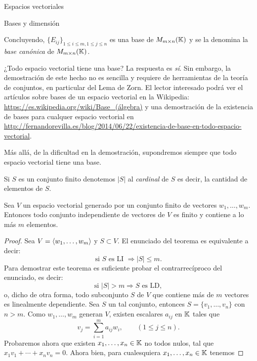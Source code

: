 \begin{chapter}{Espacios vectoriales}
\begin{section}{Bases y dimensi\'on}
\begin{ejemplo*}
    Concluyendo,  $\{E_{ij} \}_{1 \le i \le m, 1\le j \le n}$ es una base de  $M_{m \times n}(\mathbb K)$ y se la denomina la \textit{base canónica} de  $M_{m \times n}(\mathbb K)$.
\end{ejemplo*}

\begin{observacion*}
    ¿Todo espacio vectorial tiene una base? La respuesta es \textit{sí}. Sin embargo, la demostración de este hecho no es sencilla y requiere de herramientas de la teoría de conjuntos,  en particular del Lema de Zorn. El lector interesado podrá ver el artículos sobre bases de un espacio vectorial en la Wikipedia:  
    \href{https://es.wikipedia.org/wiki/Base\_(álgebra)}{https://es.wikipedia.org/wiki/Base\_(álgebra)} y una demostración de la existencia de bases para cualquer espacio vectorial en  
    \href{http://fernandorevilla.es/blog/2014/06/22/existencia-de-base-en-todo-espacio-vectorial/}{http://fernandorevilla.es/blog/2014/06/22/existencia-de-base-en-todo-espacio-vectorial}.

    Más allá, de la dificultad en la demostración, supondremos siempre que todo espacio vectorial tiene una base. 
\end{observacion*}

Si $S$ es un conjunto finito denotemos $|S|$  al \textit{cardinal} de  $S$ es decir, la cantidad de elementos de $S$. 

\begin{teorema}\label{indep-menorigual-gen}
    Sea $V$ un espacio vectorial generado por un conjunto finito de vectores $w_1,\ldots,w_m$. Entonces todo conjunto independiente de vectores de $V$ es finito y  contiene a lo más $m$ elementos. 
\end{teorema}
\begin{proof} Sea $V = \langle w_1,\ldots,w_m\rangle$ y  $S \subset V$.   El  enunciado del teorema es equivalente a decir:
    $$
    \text{si }S \text{ es LI } \Rightarrow |S| \le m.
    $$
    Para demostrar este teorema es suficiente probar el contrarrecíproco del enunciado, es decir:
    $$
    \text{si }|S| > m \Rightarrow S \text{ es LD},
    $$
    o, dicho  de otra forma, todo subconjunto $S$ de $V$ que contiene más de $m$ vectores es linealmente dependiente. Sea $S$ un tal conjunto,  entonces $S = \{v_1,\ldots,v_n\}$ con $n >m$.  Como  $w_1,\ldots,w_m$ generan $V$, existen escalares $a_{ij}$ en $\mathbb K$ tales que
    \begin{equation*}
        v_j = \sum_{i=1}^{m}a_{ij}w_i, \qquad (1 \le j \le n).
    \end{equation*}
    Probaremos ahora que existen $x_1,\ldots,x_n \in \mathbb K$ no todos nulos, tal que $x_1v_1 + \cdots+x_nv_n =0$. Ahora bien, para cualesquiera $x_1,\ldots,x_n \in \mathbb K$ tenemos



\end{proof}
\end{section}
\end{chapter}
